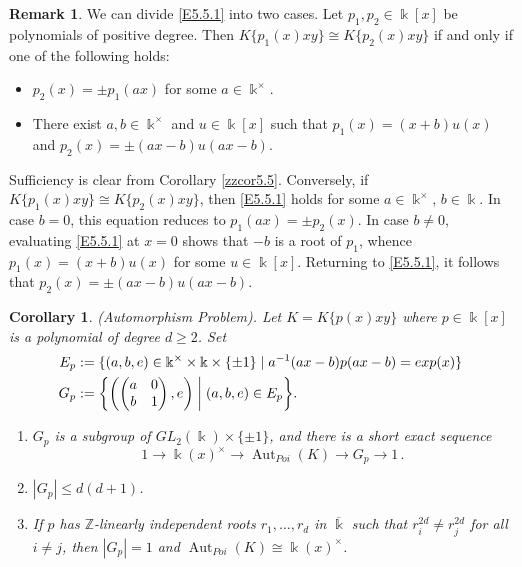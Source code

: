 \documentclass[12pt]{amsart}
\theoremstyle{plain}
\newtheorem{corollary}[theorem]{Corollary}
\numberwithin{theorem}{section}
\numberwithin{equation}{theorem}
\theoremstyle{definition}
\newtheorem{remark}[theorem]{Remark}
\newcommand{\ZZ}{\mathbb{Z}}
\DeclareMathOperator{\Aut}{Aut}
\newcommand \kx {\Bbbk^\times}
\newcommand \kbar {\overline{\Bbbk}}
\begin{document}
\begin{remark}  
\label{zzrem5.6}
We can divide \eqref{E5.5.1} into two cases. Let $p_1,p_2 \in 
\Bbbk[x]$ be polynomials of positive degree. Then $K\{p_1(x)xy\} 
\cong K\{p_2(x)xy\}$ if and only if one of the following holds:
\begin{itemize}
\item
$p_2(x) = \pm p_1(ax)$ for some $a \in \kx$.
\item 
There exist $a,b \in \kx$ and $u \in \Bbbk[x]$ such that 
$p_1(x) = (x+b) u(x)$ and $p_2(x) = \pm (ax-b) u(ax-b)$.
\end{itemize}

Sufficiency is clear from Corollary \ref{zzcor5.5}. Conversely, 
if $K\{p_1(x)xy\} \cong K\{p_2(x)xy\}$, then \eqref{E5.5.1} holds 
for some $a \in \kx$, $b \in \Bbbk$. In case $b=0$, this equation 
reduces to $p_1(ax) = \pm p_2(x)$.  In case $b\ne 0$, evaluating 
\eqref{E5.5.1} at $x=0$ shows that $-b$ is a root of $p_1$, 
whence $p_1(x) = (x+b) u(x)$ for some $u \in \Bbbk[x]$. 
Returning to \eqref{E5.5.1}, it follows that $p_2(x) = 
\pm (ax-b) u(ax-b)$.
\end{remark}

\begin{corollary}  \label{zzcor5.7}
{\rm(Automorphism Problem).}  
Let $K = K\{p(x)xy\}$ where $p \in \Bbbk[x]$ is a polynomial of degree $d \ge 2$.  Set
\begin{align*}
E_p &:= \{ (a,b,e) \in \kx \times \Bbbk \times \{\pm1\} \mid a^{-1} (ax-b) p(ax-b) = e x p(x) \}  \\
G_p &:= \biggl\{ \biggl( \begin{pmatrix} a&0\\ b&1 \end{pmatrix}, e \biggr) \biggm| (a,b,e) \in E_p \biggr\}.
\end{align*}
\begin{enumerate}
\item[(1)]
$G_p$ is a subgroup of $GL_2(\Bbbk) \times \{\pm1\}$, and there is a short exact sequence
$$
1 \rightarrow \Bbbk(x)^\times \rightarrow \Aut_{Poi}(K) \rightarrow G_p \rightarrow 1 \,.
$$
\item[(2)] 
$|G_p| \le d(d+1)$. 
\item[(3)]
If $p$ has $\ZZ$-linearly independent roots $r_1,\dots,r_d$ in $\kbar$ such that $r_i^{2d} \ne r_j^{2d}$ for all $i \ne j$, then $|G_p| = 1$ and $\Aut_{Poi}(K) \cong \Bbbk(x)^\times$.
\end{enumerate}
\end{corollary}
\end{document}
